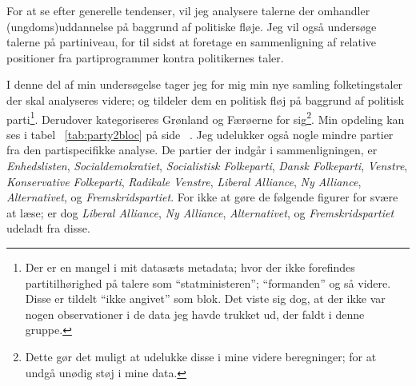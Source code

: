 For at se efter generelle tendenser, vil jeg analysere talerne der omhandler (ungdoms)uddannelse på baggrund af politiske fløje.
Jeg vil også undersøge talerne på partiniveau, for til sidst at foretage en sammenligning af relative positioner fra partiprogrammer kontra politikernes taler.

I denne del af min undersøgelse tager jeg for mig min nye samling folketingstaler der skal analyseres videre; og tildeler dem en politisk fløj på baggrund af politisk parti\footnote{Der er en mangel i mit datasæts metadata; hvor der ikke forefindes partitilhørighed på talere som “statministeren”; “formanden” og så videre. Disse er tildelt “ikke angivet” som blok. Det viste sig dog, at der ikke var nogen observationer i de data jeg havde trukket ud, der faldt i denne gruppe.}.
Derudover kategoriseres Grønland og Færøerne for sig\footnote{Dette gør det muligt at udelukke disse i mine videre beregninger; for at undgå unødig støj i mine data.}.
Min opdeling kan ses i tabel ~\ref{tab:party2bloc} på side ~\pageref{tab:party2bloc}.
Jeg udelukker også nogle mindre partier fra den partispecifikke analyse. De partier der indgår i sammenligningen, er 
\textit{Enhedslisten},
\textit{Socialdemokratiet},
\textit{Socialistisk Folkeparti},
\textit{Dansk Folkeparti},
\textit{Venstre},
\textit{Konservative Folkeparti},
\textit{Radikale Venstre},
\textit{Liberal Alliance},
\textit{Ny Alliance},
\textit{Alternativet}, og
\textit{Fremskridspartiet}.
For ikke at gøre de følgende figurer for svære at læse; er dog
\textit{Liberal Alliance},
\textit{Ny Alliance},
\textit{Alternativet}, og
\textit{Fremskridspartiet} udeladt fra disse.

